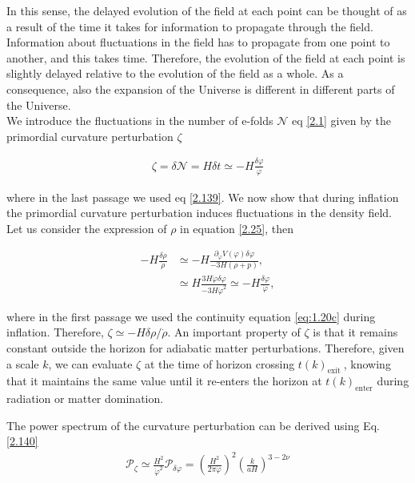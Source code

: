 In this sense, the delayed evolution of the field at each point can be thought of as a result of the time it takes for information to propagate through the field. Information about fluctuations in the field has to propagate from one point to another, and this takes time. Therefore, the evolution of the field at each point is slightly delayed relative to the evolution of the field as a whole. As a consequence, also the expansion of the Universe is different in different parts of the Universe.\\ We introduce the fluctuations in the number of e-folds $\mathcal{N}$ eq \ref{2.1} given by the primordial curvature perturbation \(\zeta\)

\begin{align}
    \zeta=\delta \mathcal{N}=H \delta t \simeq-H \frac{\delta \varphi}{\dot{\varphi}}\label{2.140}
\end{align}

where in the last passage we used eq \ref{2.139}. We now show that during inflation the primordial curvature perturbation induces fluctuations in the density field. Let us consider the expression of $\rho$ in equation \ref{2.25}, then


\begin{align}
    -H \frac{\delta \rho}{\dot{\rho}} & \simeq-H \frac{\partial_{\varphi} V(\varphi) \delta \varphi}{-3 H(\rho+p)}, \\
    & \simeq H \frac{3 H \dot{\varphi} \delta \varphi}{-3 H \dot{\varphi}^{2}} \simeq-H \frac{\delta \varphi}{\dot{\varphi}}, \label{2.142}
\end{align}


where in the first passage we used the continuity equation \ref{eq:1.20c} during inflation. Therefore, $\zeta \simeq-H \delta \rho / \dot{\rho}$. An important property of $\zeta$ is that it remains constant outside the horizon for adiabatic matter perturbations\cite{Bartolo_2004}. Therefore, given a scale $k$, we can evaluate $\zeta$ at the time of horizon crossing $t(k)_{\text {exit }}$, knowing that it maintains the same value until it re-enters the horizon at $t(k)_{\text {enter}}$ during radiation or matter domination.

The power spectrum of the curvature perturbation can be derived using Eq. \ref{2.140}
\begin{align}
    \mathcal{P}_{\zeta} \simeq \frac{H^{2}}{\dot{\varphi}^{2}} \mathcal{P}_{\delta \varphi}=\left(\frac{H^2}{2 \pi \dot{\varphi}}\right)^{2}\left(\frac{k}{a H}\right)^{3-2 \nu} \label{2.143}
\end{align}

